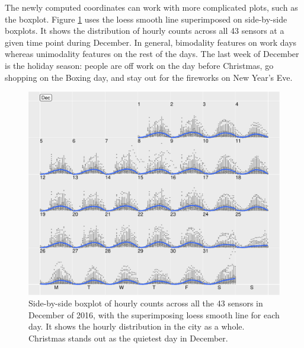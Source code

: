 \documentclass[article]{jss}
\theoremstyle{definition}
\theoremstyle{definition}
\theoremstyle{remark}
\begin{document}
The newly computed coordinates can work with more complicated plots,
such as the boxplot. Figure \ref{fig:boxplot} uses the loess smooth line
superimposed on side-by-side boxplots. It shows the distribution of
hourly counts across all 43 sensors at a given time point during
December. In general, bimodality features on work days whereas
unimodality features on the rest of the days. The last week of December
is the holiday season: people are off work on the day before Christmas,
go shopping on the Boxing day, and stay out for the fireworks on New
Year's Eve.

\begin{CodeChunk}
\begin{figure}

{\centering \includegraphics[width=\textwidth]{figure/boxplot-1} 

}

\caption[Side-by-side boxplot of hourly counts across all the
43 sensors in December of 2016, with the superimposing loess smooth line
for each day. It shows the hourly distribution in the city as a whole.
Christmas stands out as the quietest day in December.]{Side-by-side boxplot of hourly counts across all the
43 sensors in December of 2016, with the superimposing loess smooth line
for each day. It shows the hourly distribution in the city as a whole.
Christmas stands out as the quietest day in December.}\label{fig:boxplot}
\end{figure}
\end{CodeChunk}
\end{document}
